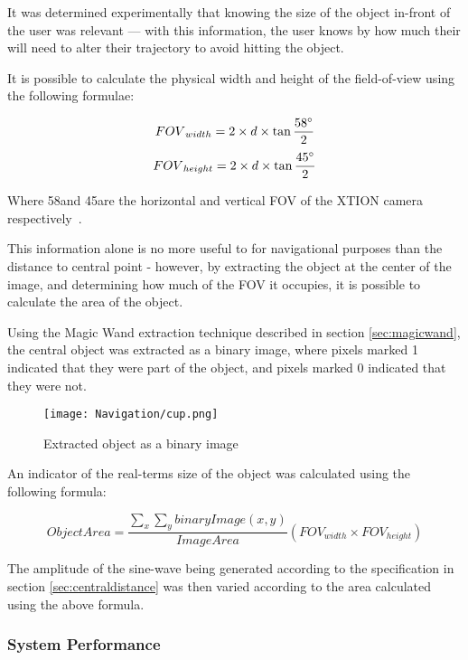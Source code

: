 It was determined experimentally that knowing the size of the object in-front of the user was relevant --- with this information, the user knows by how much their will need to alter their trajectory to avoid hitting the object. 

It is possible to calculate the physical width and height of the field-of-view using the following formulae:

\begin{equation}
{FOV}_{width} = 2 \times d \times \tan\frac{58\degree}{2}
\end{equation}
\begin{equation}
{FOV}_{height} = 2 \times d \times \tan\frac{45\degree}{2}
\end{equation}

Where 58\degree  and 45\degree  are the horizontal and vertical \ac{FOV} of the XTION camera respectively~\cite{xtion-spec}. 

This information alone is no more useful to for navigational purposes than the distance to central point - however, by extracting the object at the center of the image, and determining how much of the \ac{FOV} it occupies, it is possible to calculate the area of the object.

Using the Magic Wand extraction technique described in section \ref{sec:magicwand}, the central object was extracted as a binary image, where pixels marked 1 indicated that they were part of the object, and pixels marked 0 indicated that they were not. 
\begin{figure}[H]
    \centering
    \texttt{[image: Navigation/cup.png]}
    \caption{Extracted object as a binary image}
\end{figure}

An indicator of the real-terms size of the object was calculated using the following formula:

\begin{equation}
    {Object Area} = \frac{\sum\limits_x\sum\limits_y {binaryImage}({x}, {y})}{{ImageArea}} ({FOV}_{width} \times {FOV}_{height})
\end{equation}

The amplitude of the sine-wave being generated according to the specification in section \ref{sec:centraldistance} was then varied according to the area calculated using the above formula.

\subsubsection{System Performance}

